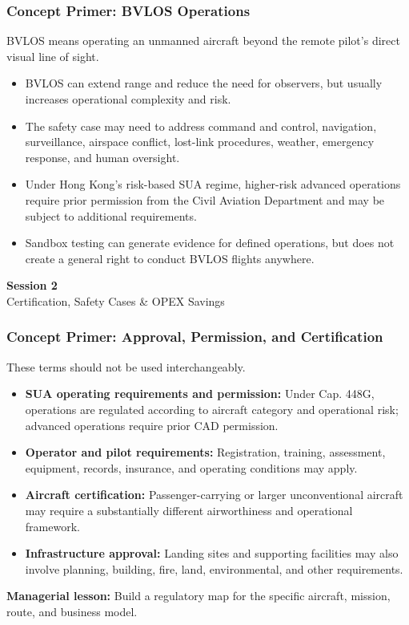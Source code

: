 \documentclass{beamer}
\begin{document}
\begin{frame}[t]
\frametitle{Concept Primer: BVLOS Operations}
BVLOS means operating an unmanned aircraft beyond the remote pilot's direct visual line of sight.
\begin{itemize}
\item BVLOS can extend range and reduce the need for observers, but usually increases operational complexity and risk.
\item The safety case may need to address command and control, navigation, surveillance, airspace conflict, lost-link procedures, weather, emergency response, and human oversight.
\item Under Hong Kong's risk-based SUA regime, higher-risk advanced operations require prior permission from the Civil Aviation Department and may be subject to additional requirements.
\item Sandbox testing can generate evidence for defined operations, but does not create a general right to conduct BVLOS flights anywhere.
\end{itemize}
\end{frame}
\begin{frame}[c]
  \begin{center}
    \huge\color{cuhkpurple}\textbf{Session 2}\\
    \vspace{0.5cm}
    \Large Certification, Safety Cases \& OPEX Savings
  \end{center}
\end{frame}

\begin{frame}[t]
\frametitle{Concept Primer: Approval, Permission, and Certification}
These terms should not be used interchangeably.
\begin{itemize}
\item \textbf{SUA operating requirements and permission:} Under Cap. 448G, operations are regulated according to aircraft category and operational risk; advanced operations require prior CAD permission.
\item \textbf{Operator and pilot requirements:} Registration, training, assessment, equipment, records, insurance, and operating conditions may apply.
\item \textbf{Aircraft certification:} Passenger-carrying or larger unconventional aircraft may require a substantially different airworthiness and operational framework.
\item \textbf{Infrastructure approval:} Landing sites and supporting facilities may also involve planning, building, fire, land, environmental, and other requirements.
\end{itemize}
\textbf{Managerial lesson:} Build a regulatory map for the specific aircraft, mission, route, and business model.
\end{frame}
\end{document}

